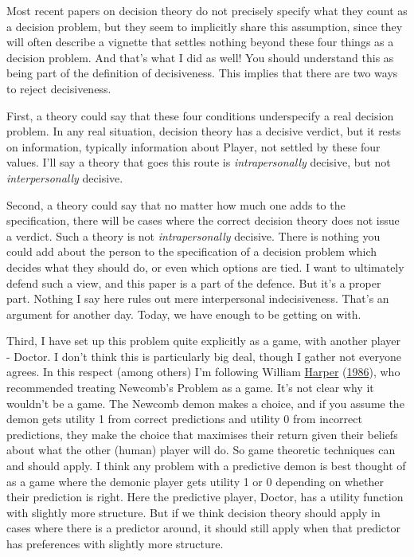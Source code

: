\documentclass[
  12pt,
]{article}
\begin{document}
Most recent papers on decision theory do not precisely specify what they
count as a decision problem, but they seem to implicitly share this
assumption, since they will often describe a vignette that settles
nothing beyond these four things as a decision problem. And that's what
I did as well! You should understand this as being part of the
definition of decisiveness. This implies that there are two ways to
reject decisiveness.

First, a theory could say that these four conditions underspecify a real
decision problem. In any real situation, decision theory has a decisive
verdict, but it rests on information, typically information about
Player, not settled by these four values. I'll say a theory that goes
this route is \emph{intrapersonally} decisive, but not
\emph{interpersonally} decisive.

Second, a theory could say that no matter how much one adds to the
specification, there will be cases where the correct decision theory
does not issue a verdict. Such a theory is not \emph{intrapersonally}
decisive. There is nothing you could add about the person to the
specification of a decision problem which decides what they should do,
or even which options are tied. I want to ultimately defend such a view,
and this paper is a part of the defence. But it's a proper part. Nothing
I say here rules out mere interpersonal indecisiveness. That's an
argument for another day. Today, we have enough to be getting on with.

Third, I have set up this problem quite explicitly as a game, with
another player - Doctor. I don't think this is particularly big deal,
though I gather not everyone agrees. In this respect (among others) I'm
following William \protect\hyperlink{ref-Harper1986}{Harper}
(\protect\hyperlink{ref-Harper1986}{1986}), who recommended treating
Newcomb's Problem as a game. It's not clear why it wouldn't be a game.
The Newcomb demon makes a choice, and if you assume the demon gets
utility 1 from correct predictions and utility 0 from incorrect
predictions, they make the choice that maximises their return given
their beliefs about what the other (human) player will do. So game
theoretic techniques can and should apply. I think any problem with a
predictive demon is best thought of as a game where the demonic player
gets utility 1 or 0 depending on whether their prediction is right. Here
the predictive player, Doctor, has a utility function with slightly more
structure. But if we think decision theory should apply in cases where
there is a predictor around, it should still apply when that predictor
has preferences with slightly more structure.
\end{document}
